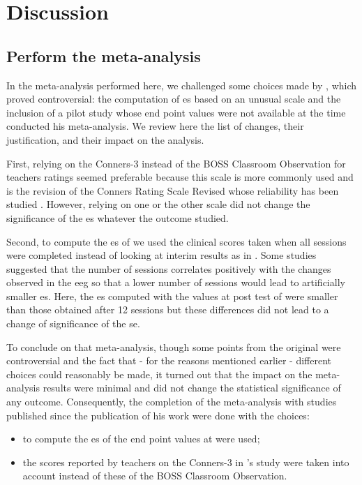


\section{Discussion}

\subsection{Perform the meta-analysis} 
In the meta-analysis performed here, we challenged some choices made by
\citeauthor{Cortese2016}, which proved controversial: the computation of \gls{es} based on an unusual scale
\citep{Steiner2014} and the inclusion of a pilot study \citep{Arnold2014} whose end point values were not available at
the time \citeauthor{Cortese2016} conducted his meta-analysis. We review here the list of changes, their justification,
and their impact on the analysis.
 
First, relying on the Conners-3 \citep{Conners2008} instead of the BOSS Classroom Observation \citep{Shapiro2010} for
teachers ratings seemed preferable because this scale is more commonly used \citep{Christiansen2014, Bluschke2016} and is
the revision of the Conners Rating Scale Revised \citep{Conners1998} whose reliability has been studied
\citep{Collett2003}. However, relying on one or the other scale did not change the significance of the \gls{es} whatever
the outcome studied.

Second, to compute the \gls{es} of \citet{Arnold2014} we used the clinical scores taken when all sessions
were completed instead of looking at interim results as in \citeauthor{Cortese2016}. Some studies suggested that the
number of sessions correlates positively with the changes observed in the
\gls{eeg} \citep{Vernon2004} so that a lower number of sessions would lead to artificially smaller \gls{es}. Here, the
\gls{es} computed with the values at post test of \citet{Arnold2014} were smaller than those obtained after 12 sessions
but these differences did not lead to a change of significance of the \gls{se}. 

To conclude on that meta-analysis, though some points from the original were controversial and the fact that - for the
reasons mentioned earlier - different choices could reasonably be made, it turned out that the impact on the
meta-analysis results were minimal and did not change the statistical significance of any outcome.  Consequently, the
completion of the meta-analysis with studies published since the publication of his work were done with the choices:
\begin{itemize} 
  \item to compute the \gls{es} of \citet{Arnold2014} the end point values at were used; 
  \item the scores reported by teachers on the Conners-3 in \citeauthor{Steiner2014}'s study were taken into account instead of these of the BOSS Classroom Observation.  
\end{itemize} 


